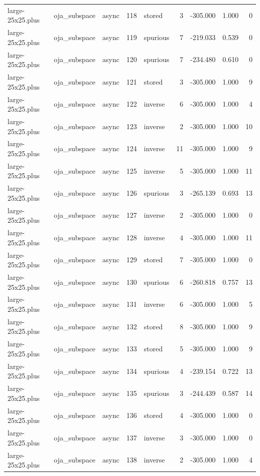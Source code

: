 \begin{tabular}{lllrlrrrr}
large-25x25.plus & oja\_subspace & async & 118 & stored & 3 & -305.000 & 1.000 & 0 \\
large-25x25.plus & oja\_subspace & async & 119 & spurious & 7 & -219.033 & 0.539 & 0 \\
large-25x25.plus & oja\_subspace & async & 120 & spurious & 7 & -234.480 & 0.610 & 0 \\
large-25x25.plus & oja\_subspace & async & 121 & stored & 3 & -305.000 & 1.000 & 9 \\
large-25x25.plus & oja\_subspace & async & 122 & inverse & 6 & -305.000 & 1.000 & 4 \\
large-25x25.plus & oja\_subspace & async & 123 & inverse & 2 & -305.000 & 1.000 & 10 \\
large-25x25.plus & oja\_subspace & async & 124 & inverse & 11 & -305.000 & 1.000 & 9 \\
large-25x25.plus & oja\_subspace & async & 125 & inverse & 5 & -305.000 & 1.000 & 11 \\
large-25x25.plus & oja\_subspace & async & 126 & spurious & 3 & -265.139 & 0.693 & 13 \\
large-25x25.plus & oja\_subspace & async & 127 & inverse & 2 & -305.000 & 1.000 & 0 \\
large-25x25.plus & oja\_subspace & async & 128 & inverse & 4 & -305.000 & 1.000 & 11 \\
large-25x25.plus & oja\_subspace & async & 129 & stored & 7 & -305.000 & 1.000 & 0 \\
large-25x25.plus & oja\_subspace & async & 130 & spurious & 6 & -260.818 & 0.757 & 13 \\
large-25x25.plus & oja\_subspace & async & 131 & inverse & 6 & -305.000 & 1.000 & 5 \\
large-25x25.plus & oja\_subspace & async & 132 & stored & 8 & -305.000 & 1.000 & 9 \\
large-25x25.plus & oja\_subspace & async & 133 & stored & 5 & -305.000 & 1.000 & 9 \\
large-25x25.plus & oja\_subspace & async & 134 & spurious & 4 & -239.154 & 0.722 & 13 \\
large-25x25.plus & oja\_subspace & async & 135 & spurious & 3 & -244.439 & 0.587 & 14 \\
large-25x25.plus & oja\_subspace & async & 136 & stored & 4 & -305.000 & 1.000 & 0 \\
large-25x25.plus & oja\_subspace & async & 137 & inverse & 3 & -305.000 & 1.000 & 0 \\
large-25x25.plus & oja\_subspace & async & 138 & inverse & 2 & -305.000 & 1.000 & 4 \\

\end{tabular}
